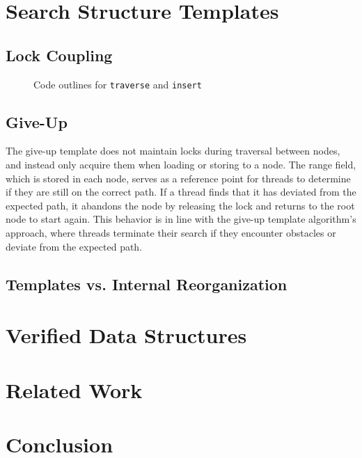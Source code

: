 \documentclass[a4paper,UKenglish,cleveref, autoref, thm-restate]{lipics-v2021}
\begin{document}
\section{Search Structure Templates}
\subsection{Lock Coupling}
\begin{figure}[!ht]
	\begin{subfigure}[t]{0.48\textwidth}
		 
	\end{subfigure}\qquad
		\begin{subfigure}[t]{0.49\textwidth}
			 
	\end{subfigure}
	\caption{Code outlines for \lstinline{traverse} and \lstinline{insert}}
	\label{bst-conc}
\end{figure}
\newpage
\subsection{Give-Up}

The give-up template does not maintain locks during traversal between nodes, and instead only acquire them when loading or storing to a node. The range field, which is stored in each node, serves as a reference point for threads to determine if they are still on the correct path. If a thread finds that it has deviated from the expected path, it abandons the node by releasing the lock and returns to the root node to start again. This behavior is in line with the give-up template algorithm's approach, where threads terminate their search if they encounter obstacles or deviate from the expected path.

\subsection{Templates vs. Internal Reorganization}

\section{Verified Data Structures}

\section{Related Work}

\section{Conclusion}







\end{document}
